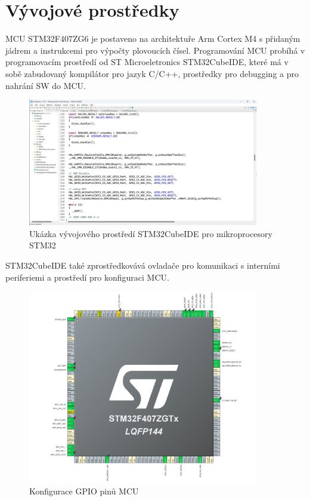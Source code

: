 \section{Vývojové prostředky}
MCU STM32F407ZG6 je postaveno na architektuře Arm Cortex M4 s přidaným jádrem a instrukcemi pro výpočty plovoucích čísel.
Programování MCU probíhá v programovacím prostředí od ST Microeletronics STM32CubeIDE, které má v sobě zabudovaný kompilátor pro jazyk C/C++, prostředky pro debugging a pro nahrání SW do MCU.
\begin{figure}[H]
    \caption{Ukázka vývojového prostředí STM32CubeIDE pro mikroprocesory STM32}
    \includegraphics[width=0.9\textwidth]{pictures/cubeide.jpg}
\end{figure}
STM32CubeIDE také zprostředkovává ovladače pro komunikaci s interními periferiemi a prostředí pro konfiguraci MCU.
\begin{figure}[H]
    \caption{Konfigurace GPIO pinů MCU}
    \includegraphics[width=0.9\textwidth]{pictures/mcu_settings.jpg}
\end{figure}
